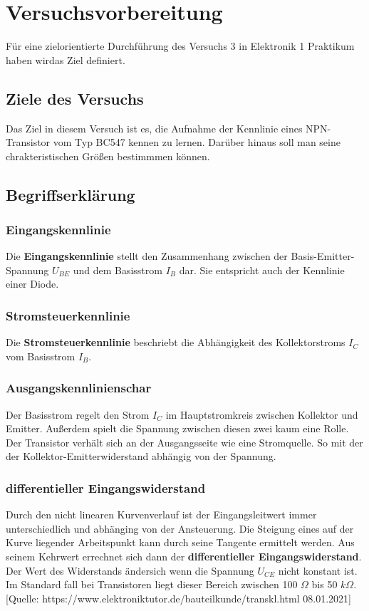 \chapter{Versuchsvorbereitung}
Für eine zielorientierte Durchführung des Versuchs 3 in Elektronik 1 Praktikum haben wirdas Ziel definiert.
    \section{Ziele des Versuchs}
        Das Ziel in diesem Versuch ist es, die Aufnahme der Kennlinie eines NPN-Transistor vom Typ BC547 kennen zu lernen. Darüber hinaus soll man seine chrakteristischen Größen bestimmmen können.

    \section{Begriffserklärung}
        \subsection{Eingangskennlinie}
            Die \textbf{Eingangskennlinie} stellt den Zusammenhang zwischen der Basis-Emitter-Spannung \(U_{BE}\) und dem Basisstrom \(I_B\) dar. Sie entspricht auch der Kennlinie einer Diode.
        \subsection{Stromsteuerkennlinie}
            Die \textbf{Stromsteuerkennlinie} beschriebt die Abhängigkeit des Kollektorstroms \(I_C\) vom Basisstrom \(I_B\). 
        \subsection{Ausgangskennlinienschar}
            Der Basisstrom regelt den Strom \(I_C\) im Hauptstromkreis zwischen Kollektor und Emitter. Außerdem spielt die Spannung zwischen diesen zwei kaum eine Rolle. Der Transistor verhält sich an der Ausgangsseite wie eine Stromquelle. So mit der der Kollektor-Emitterwiderstand abhängig von der Spannung.
        \subsection{differentieller Eingangswiderstand}
            Durch den nicht linearen Kurvenverlauf ist der Eingangsleitwert immer unterschiedlich und abhänging von der Ansteuerung. Die Steigung eines auf der Kurve liegender Arbeitspunkt kann durch seine Tangente ermittelt werden. Aus seinem Kehrwert errechnet sich dann der \textbf{differentieller Eingangswiderstand}. 
            Der Wert des Widerstands ändersich wenn die Spannung \(U_{CE}\) nicht konstant ist.
            Im Standard fall bei Transistoren liegt dieser Bereich zwischen 100 \(\Omega \) bis 50 \(k\Omega \). [Quelle: https://www.elektroniktutor.de/bauteilkunde/transkl.html 08.01.2021]
